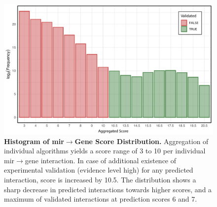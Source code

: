 \begin{figure}
\includegraphics[width=\textwidth]{figures/db-score-hist}
\caption[Histogram of \ac{mir}$\to$Gene Score Distribution.]{\textbf{Histogram of \ac{mir}$\to$Gene Score Distribution.} Aggregation of individual algorithms yields a score range of 3 to 10 per individual \ac{mir}$\to$gene interaction. In case of additional existence of experimental validation (evidence level high) for any predicted interaction, score is increased by 10.5. The distribution shows a sharp decrease in predicted interactions towards higher scores, and a maximum of validated interactions at prediction scores 6 and 7. 
\label{fig:db-score-hist}}
\end{figure}

